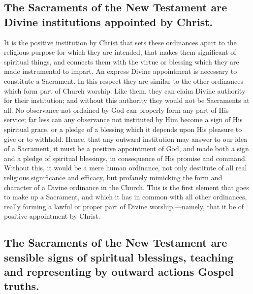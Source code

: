 \documentclass[english,]{book}
\begin{document}
\hypertarget{the-sacraments-of-the-new-testament-are-divine-institutions-appointed-by-christ.}{%
\subsection{The Sacraments of the New Testament are Divine institutions appointed by Christ.}\label{the-sacraments-of-the-new-testament-are-divine-institutions-appointed-by-christ.}}

It is the positive institution by Christ that sets these ordinances apart to the religious purpose for which they are intended, that makes them significant of spiritual things, and connects them with the virtue or blessing which they are made instrumental to impart. An express Divine appointment is necessary to constitute a Sacrament. In this respect they are similar to the other ordinances which form part of Church worship. Like them, they can claim Divine authority for their institution; and without this authority they would not be Sacraments at all. No observance not ordained by God can properly form any part of His service; far less can any observance not instituted by Him become a sign of His spiritual grace, or a pledge of a blessing which it depends upon His pleasure to give or to withhold. Hence, that any outward institution may answer to our idea of a Sacrament, it must be a positive appointment of God, and made both a sign and a pledge of spiritual blessings, in consequence of His promise and command. Without this, it would be a mere human ordinance, not only destitute of all real religious significance and efficacy, but profanely mimicking the form and character of a Divine ordinance in the Church. This is the first element that goes to make up a Sacrament, and which it has in common with all other ordinances, really forming a lawful or proper part of Divine worship,---namely, that it be of positive appointment by Christ.

\hypertarget{the-sacraments-of-the-new-testament-are-sensible-signs-of-spiritual-blessings-teaching-and-representing-by-outward-actions-gospel-truths.}{%
\subsection{The Sacraments of the New Testament are sensible signs of spiritual blessings, teaching and representing by outward actions Gospel truths.}\label{the-sacraments-of-the-new-testament-are-sensible-signs-of-spiritual-blessings-teaching-and-representing-by-outward-actions-gospel-truths.}}
\end{document}
